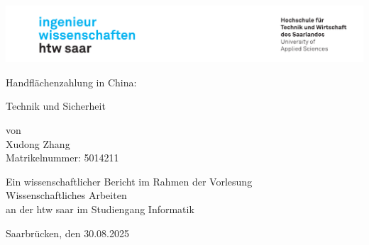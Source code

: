 \begin{titlepage}

\linespread{1.5}

\includegraphics[width=\linewidth]{graphics/htw_logo}

\begin{center}
    \large  
    \hfill
    \vfill
    \Large{\bfseries{Handflächenzahlung in China: 
    
    Technik und Sicherheit}}
    
    von \\
    Xudong Zhang \\
    Matrikelnummer: 5014211\\

    \vfill
		
    Ein wissenschaftlicher Bericht im Rahmen der Vorlesung\\
    \glqq Wissenschaftliches Arbeiten\grqq\\
    an der htw saar im Studiengang Informatik\\
	
    \vfill	
    \vfill
	
    Saarbrücken, den 30.08.2025
\end{center}
    
\end{titlepage}
